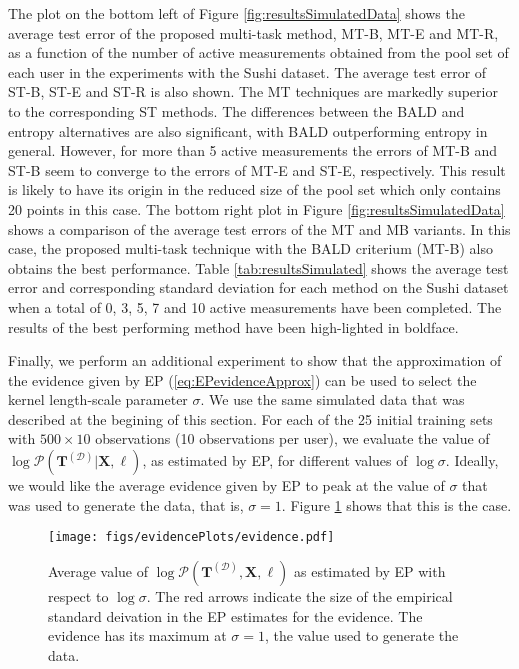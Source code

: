 The plot on the bottom left of Figure \ref{fig:resultsSimulatedData} shows the average test error of the proposed multi-task method,
MT-B, MT-E and MT-R, as a function of the number of active measurements obtained from
the pool set of each user in the experiments with the Sushi dataset.
The average test error of ST-B, ST-E and ST-R is also shown.
The MT techniques are markedly superior to the corresponding ST methods.
The differences between the BALD and entropy alternatives are also significant, with BALD outperforming entropy in general.
However, for more than 5 active measurements the errors of MT-B and ST-B seem to converge to the errors of MT-E and ST-E, respectively.
This result is likely to have its origin in the reduced size of the pool set which only contains 20 points in this case.
The bottom right plot in Figure \ref{fig:resultsSimulatedData} shows a comparison of the
average test errors of the MT and MB variants. In this case, the proposed multi-task technique with the BALD criterium (MT-B)
also obtains the best performance.
Table \ref{tab:resultsSimulated} shows the average test error and corresponding standard deviation for each method
on the Sushi dataset when a total of 0, 3, 5, 7 and 10 active measurements have been completed. The results of the
best performing method have been high-lighted in boldface.



Finally, we perform an additional experiment to show
that the approximation of the evidence given by EP (\ref{eq:EPevidenceApprox}) can be used to select
the kernel length-scale parameter $\sigma$. We use the same simulated data that was described at the begining of this section.
For each of the 25 initial training sets with $500 \times 10$ observations (10 observations per user),
we evaluate the value of $\log \mathcal{P}(\mathbf{T}^{(\mathcal{D})}|\mathbf{X},\ell)$, as estimated by EP,
for different values of $\log \sigma$. Ideally, we would like the average evidence given by EP
to peak at the value of $\sigma$ that was used to generate the data, that is, $\sigma = 1$.
Figure \ref{fig:evidencePlot} shows that this is the case.

\begin{figure}
\begin{center}
\texttt{[image: figs/evidencePlots/evidence.pdf]}
\caption{
Average value of $\log \mathcal{P}(\mathbf{T}^{(\mathcal{D})}, \mathbf{X}, \ell)$ as estimated by EP with respect to $\log \sigma$. 
The red arrows indicate the size of the empirical standard deivation in the EP estimates for the evidence.
The evidence has its maximum at $\sigma = 1$, the value used to generate the data.
}\label{fig:evidencePlot}
\end{center}
\end{figure}
